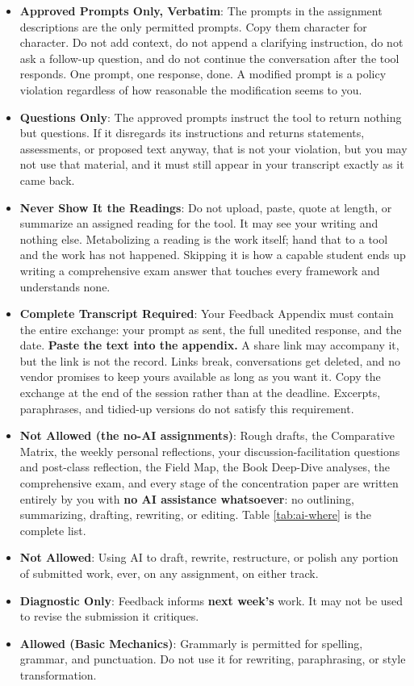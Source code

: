\documentclass[11pt]{article}     %
\begin{document}
\begin{itemize}
    \item \textbf{Approved Prompts Only, Verbatim}: The prompts in the assignment descriptions are the only permitted prompts. Copy them character for character. Do not add context, do not append a clarifying instruction, do not ask a follow-up question, and do not continue the conversation after the tool responds. One prompt, one response, done. A modified prompt is a policy violation regardless of how reasonable the modification seems to you.
    \item \textbf{Questions Only}: The approved prompts instruct the tool to return nothing but questions. If it disregards its instructions and returns statements, assessments, or proposed text anyway, that is not your violation, but you may not use that material, and it must still appear in your transcript exactly as it came back.
    \item \textbf{Never Show It the Readings}: Do not upload, paste, quote at length, or summarize an assigned reading for the tool. It may see your writing and nothing else. Metabolizing a reading is the work itself; hand that to a tool and the work has not happened. Skipping it is how a capable student ends up writing a comprehensive exam answer that touches every framework and understands none.
    \item \textbf{Complete Transcript Required}: Your Feedback Appendix must contain the entire exchange: your prompt as sent, the full unedited response, and the date. \textbf{Paste the text into the appendix.} A share link may accompany it, but the link is not the record. Links break, conversations get deleted, and no vendor promises to keep yours available as long as you want it. Copy the exchange at the end of the session rather than at the deadline. Excerpts, paraphrases, and tidied-up versions do not satisfy this requirement.
    \item \textbf{Not Allowed (the no-AI assignments)}: Rough drafts, the Comparative Matrix, the weekly personal reflections, your discussion-facilitation questions and post-class reflection, the Field Map, the Book Deep-Dive analyses, the comprehensive exam, and every stage of the concentration paper are written entirely by you with \textbf{no AI assistance whatsoever}: no outlining, summarizing, drafting, rewriting, or editing. Table \ref{tab:ai-where} is the complete list.
    \item \textbf{Not Allowed}: Using AI to draft, rewrite, restructure, or polish any portion of submitted work, ever, on any assignment, on either track.
    \item \textbf{Diagnostic Only}: Feedback informs \textbf{next week's} work. It may not be used to revise the submission it critiques.
    \item \textbf{Allowed (Basic Mechanics)}: Grammarly is permitted for spelling, grammar, and punctuation. Do not use it for rewriting, paraphrasing, or style transformation.
\end{itemize}
\end{document}
